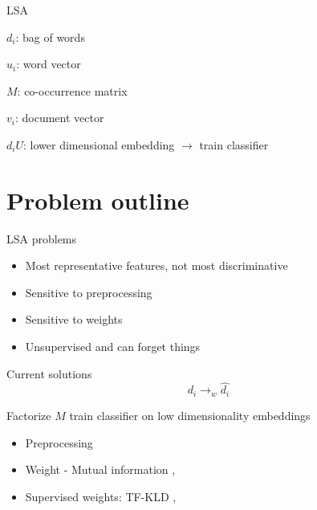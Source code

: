 \documentclass[xcolor={table}]{beamer}
\begin{document}
\begin{frame}{LSA}
~
    {\tiny }
    \begin{block}
        
        $d_i$: bag of words
        
        $u_i$: word vector
        
        $M$: co-occurrence matrix
        
        $v_i$: document vector
        
        $d_i U$: lower dimensional embedding $\rightarrow$ train classifier
    \end{block}
\end{frame}

\section{Problem outline}
\begin{frame}{LSA problems}
    \begin{block}{}
        \begin{itemize}
            \item Most representative features, not most discriminative
            \item Sensitive to preprocessing
            \item Sensitive to weights
            \item Unsupervised and can forget things
        \end{itemize}
    \end{block}
\end{frame} 

\begin{frame}{Current solutions}
    $$ d_i \rightarrow_w \hat{d_i} $$
    
    Factorize $M$ train classifier on low dimensionality embeddings

    \begin{block}{}
        \begin{itemize}
            \item Preprocessing
            \item Weight - Mutual information \cite{wu2017balancing}, \cite{deng2014study}
            \item Supervised weights: TF-KLD \cite{ji2013discriminative}, \cite{lan2009supervised}
        \end{itemize}
    \end{block}
\end{frame} 
\end{document}
